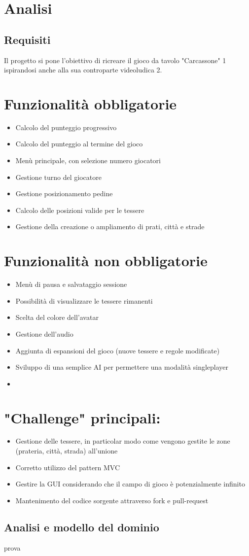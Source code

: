\section{Analisi}
\subsection{Requisiti}
Il progetto si pone l'obiettivo di ricreare il gioco da tavolo "Carcassone" 1 ispirandosi anche alla sua controparte videoludica 2.

\section{Funzionalità obbligatorie}
\begin{itemize}
\item Calcolo del punteggio progressivo
\item Calcolo del punteggio al termine del gioco
\item Menù principale, con selezione numero giocatori
\item Gestione turno del giocatore
\item Gestione posizionamento pedine
\item Calcolo delle posizioni valide per le tessere
\item Gestione della creazione o ampliamento di prati, città e strade
\end{itemize}

\section{Funzionalità non obbligatorie}
\begin{itemize}
\item Menù di pausa e salvataggio sessione
\item Possibilità di visualizzare le tessere rimanenti
\item Scelta del colore dell’avatar
\item Gestione dell’audio
\item Aggiunta di espansioni del gioco (nuove tessere e regole modificate)
\item Sviluppo di una semplice AI per permettere una modalità singleplayer
\item \end{itemize}

\section{"Challenge" principali:}
\begin{itemize}
\item Gestione delle tessere, in particolar modo come vengono gestite le zone (prateria, città, strada) all’unione
\item Corretto utilizzo del pattern MVC
\item Gestire la GUI considerando che il campo di gioco è potenzialmente infinito
\item Mantenimento del codice sorgente attraverso fork e pull-request
\end{itemize}

\subsection{Analisi e modello del dominio}
prova